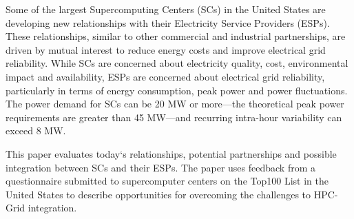 Some of the largest Supercomputing Centers (SCs) in the United States are developing new relationships with their Electricity Service Providers (ESPs). These relationships, similar to other commercial and industrial partnerships, are driven by mutual interest to reduce energy costs and improve electrical grid reliability. While SCs are concerned about electricity quality, cost, environmental impact and availability, ESPs are concerned about electrical grid reliability, particularly in terms of energy consumption, peak power and power fluctuations. The power demand for SCs can be 20 MW or more---the theoretical peak power requirements are greater than 45 MW---and recurring intra-hour variability can exceed 8 MW.

This paper evaluates today`s relationships, potential partnerships and possible integration between SCs and their ESPs. The paper uses feedback from a questionnaire submitted to supercomputer centers on the Top100 List in the United States to describe opportunities for overcoming the challenges to HPC-Grid integration.


%
%
%
%
%
%

